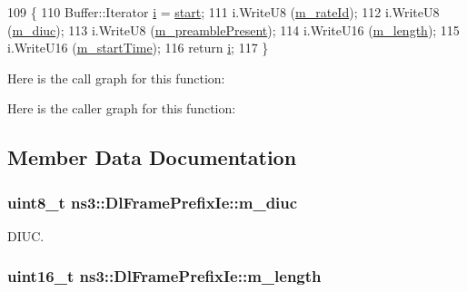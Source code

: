 \begin{DoxyCode}
109 \{
110   Buffer::Iterator \hyperlink{bernuolliDistribution_8m_a6f6ccfcf58b31cb6412107d9d5281426}{i} = \hyperlink{namespacevisualizer_1_1core_a2a35e5d8a34af358b508dac8635754e0}{start};
111   i.WriteU8 (\hyperlink{classns3_1_1DlFramePrefixIe_a7ee2b805b0bb5ff17836c35b137319aa}{m\_rateId});
112   i.WriteU8 (\hyperlink{classns3_1_1DlFramePrefixIe_a255a751e972f83e65f9f6aa4cb93094d}{m\_diuc});
113   i.WriteU8 (\hyperlink{classns3_1_1DlFramePrefixIe_a29e2165424da96b23e791e031ebc99fa}{m\_preamblePresent});
114   i.WriteU16 (\hyperlink{classns3_1_1DlFramePrefixIe_ad951c91e96c6d2ae21d3f668751e4308}{m\_length});
115   i.WriteU16 (\hyperlink{classns3_1_1DlFramePrefixIe_a3ce62c0aa1b6efe951e43250d40c985a}{m\_startTime});
116   \textcolor{keywordflow}{return} \hyperlink{bernuolliDistribution_8m_a6f6ccfcf58b31cb6412107d9d5281426}{i};
117 \}
\end{DoxyCode}


Here is the call graph for this function\+:




Here is the caller graph for this function\+:




\subsection{Member Data Documentation}
\subsubsection[{\texorpdfstring{m\+\_\+diuc}{m_diuc}}]{\setlength{\rightskip}{0pt plus 5cm}uint8\+\_\+t ns3\+::\+Dl\+Frame\+Prefix\+Ie\+::m\+\_\+diuc\hspace{0.3cm}{\ttfamily [private]}}\hypertarget{classns3_1_1DlFramePrefixIe_a255a751e972f83e65f9f6aa4cb93094d}{}\label{classns3_1_1DlFramePrefixIe_a255a751e972f83e65f9f6aa4cb93094d}


D\+I\+UC. 

\subsubsection[{\texorpdfstring{m\+\_\+length}{m_length}}]{\setlength{\rightskip}{0pt plus 5cm}uint16\+\_\+t ns3\+::\+Dl\+Frame\+Prefix\+Ie\+::m\+\_\+length\hspace{0.3cm}{\ttfamily [private]}}\hypertarget{classns3_1_1DlFramePrefixIe_ad951c91e96c6d2ae21d3f668751e4308}{}\label{classns3_1_1DlFramePrefixIe_ad951c91e96c6d2ae21d3f668751e4308}


